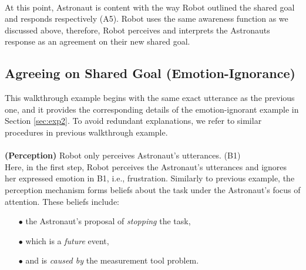 \noindent{}\\

At this point, Astronaut is content with the way Robot outlined the shared goal
and responds respectively (A5). Robot uses the same awareness function as we
discussed above, therefore, Robot perceives and interprets the Astronauts
response as an agreement on their new shared goal.\\

\noindent{}

\subsection{Agreeing on Shared Goal (Emotion-Ignorance)}
\label{sec:wt-exp2}

This walkthrough example begins with the same exact utterance as the previous
one, and it provides the corresponding details of the emotion-ignorant example
in Section \ref{sec:exp2}. To avoid redundant explanations, we refer to similar
procedures in previous walkthrough example.\\

\noindent{}\\

\noindent\textbf{(Perception)} Robot only perceives Astronaut's utterances.
(B1)\\

Here, in the first step, Robot perceives the Astronaut's utterances and ignores
her expressed emotion in B1, i.e., frustration. Similarly to previous
example, the perception mechanism forms beliefs about the task under the
Astronaut's focus of attention. These beliefs include:

\begin{itemize}
  \item[$\bullet$] the Astronaut's proposal of \textit{stopping} the task,
  \item[$\bullet$] which is a \textit{future} event,
  \item[$\bullet$] and is \textit{caused by} the measurement tool problem.
\end{itemize}

